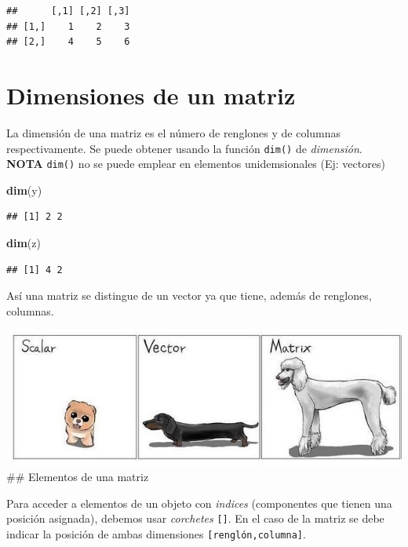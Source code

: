 \documentclass[
]{book}
\newenvironment{Shaded}{\begin{snugshade}}{\end{snugshade}}
\newcommand{\FunctionTok}[1]{\textcolor[rgb]{0.13,0.29,0.53}{\textbf{#1}}}
\newcommand{\NormalTok}[1]{#1}
\begin{document}
\begin{verbatim}
##      [,1] [,2] [,3]
## [1,]    1    2    3
## [2,]    4    5    6
\end{verbatim}

\hypertarget{dimensiones-de-un-matriz}{%
\section{Dimensiones de un matriz}\label{dimensiones-de-un-matriz}}

La dimensión de una matriz es el número de renglones y de columnas respectivamente. Se puede obtener usando la función \texttt{dim()} de \emph{dimensión}.
\textbf{NOTA}
\texttt{dim()} no se puede emplear en elementos unidemsionales (Ej: vectores)

\begin{Shaded}
\begin{Highlighting}[]
\FunctionTok{dim}\NormalTok{(y)}
\end{Highlighting}
\end{Shaded}

\begin{verbatim}
## [1] 2 2
\end{verbatim}

\begin{Shaded}
\begin{Highlighting}[]
\FunctionTok{dim}\NormalTok{(z)}
\end{Highlighting}
\end{Shaded}

\begin{verbatim}
## [1] 4 2
\end{verbatim}

Así una matriz se distingue de un vector ya que tiene, además de renglones, columnas.

\includegraphics{Escalar_Vector_Matriz.jpeg}
\#\# Elementos de una matriz

Para acceder a elementos de un objeto con \emph{indices} (componentes que tienen una posición asignada), debemos usar \emph{corchetes} \texttt{{[}{]}}. En el caso de la matriz se debe indicar la posición de ambas dimensiones \texttt{{[}renglón,columna{]}}.
\end{document}
